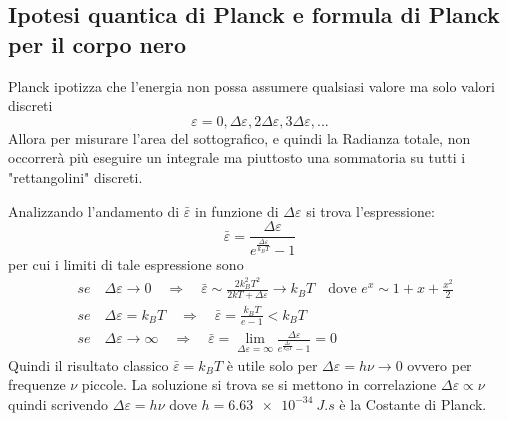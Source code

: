 \subsection{Ipotesi quantica di Planck e formula di Planck per il corpo nero}
Planck ipotizza che l'energia non possa assumere qualsiasi valore ma solo valori discreti
$$\varepsilon = 0,\Delta\varepsilon,2\Delta\varepsilon,3\Delta\varepsilon, ...$$
Allora per misurare l'area del sottografico, e quindi la Radianza totale, non occorrerà più eseguire un integrale ma piuttosto una sommatoria su tutti i "rettangolini" discreti.
\begin{figure}[h]
    \centering
    \label{ipotesi_quantica_Planck_rettangolini}
\end{figure}
Analizzando l'andamento di $\bar\varepsilon$ in funzione di $\Delta\varepsilon$ si trova l'espressione:
\begin{equation}
\bar\varepsilon = \frac{ \Delta\varepsilon}{e^{ \frac{ \Delta\varepsilon}{k_BT } } - 1 }
\end{equation}
per cui i limiti di tale espressione sono
\begin{equation}
\begin{split}
& se \quad \Delta\varepsilon \rightarrow 0 \quad \Rightarrow \quad \bar\varepsilon \sim \frac{ 2 k_B^2 T^2 }{2kT + \Delta\varepsilon } \rightarrow k_BT  \quad \mbox{dove } e^x \sim 1 + x + \frac{ x^2}{2 } \\
& se \quad \Delta\varepsilon = k_BT \quad \Rightarrow \quad \bar\varepsilon = \frac{ k_BT }{ e - 1 } < k_BT \\
& se \quad \Delta\varepsilon \rightarrow \infty \quad \Rightarrow \quad \bar\varepsilon = \lim_{\Delta\varepsilon = \infty}  \frac{ \Delta\varepsilon}{e^{ \frac{ \Delta\varepsilon}{k_BT } } - 1 } = 0
\end{split}
\end{equation}
Quindi il risultato classico $\bar\varepsilon = k_BT$ è utile solo per $\Delta\varepsilon = h\nu \rightarrow 0$ ovvero per frequenze $\nu$ piccole.
La soluzione si trova se si mettono in correlazione $\Delta\varepsilon \propto \nu$ quindi scrivendo $\Delta\varepsilon = h\nu$ dove $h=\SI{6.63e-34}{J.s}$ è la Costante di Planck.
